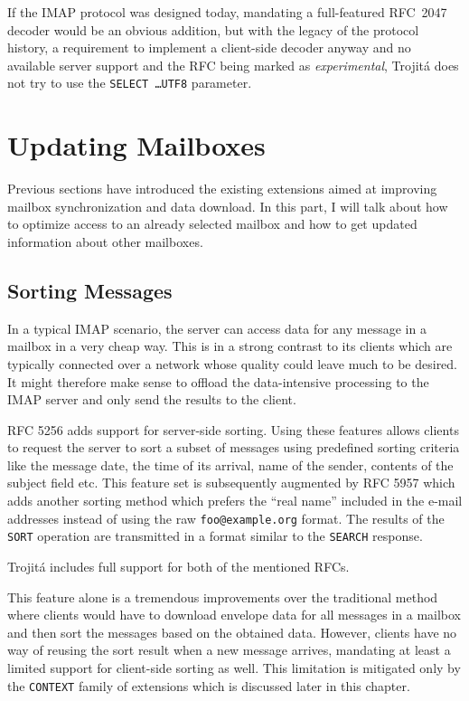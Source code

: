 \documentclass[trojita]{subfiles}
\begin{document}
\begin{trojitabehavior}
If the IMAP protocol was designed today, mandating a full-featured RFC~2047 decoder would be an obvious addition, but
with the legacy of the protocol history, a requirement to implement a client-side decoder anyway and no available server
support and the RFC being marked as {\em experimental}, Trojitá does not try to use the {\tt SELECT \ldots UTF8}
parameter.
\end{trojitabehavior}

\section{Updating Mailboxes}

Previous sections have introduced the existing extensions aimed at improving mailbox synchronization and data download.
In this part, I will talk about how to optimize access to an already selected mailbox and how to get updated information
about other mailboxes.

\subsection{Sorting Messages}

In a typical IMAP scenario, the server can access data for any message in a mailbox in a very cheap way.  This is in a
strong contrast to its clients which are typically connected over a network whose quality could leave much to be
desired.  It might therefore make sense to offload the data-intensive processing to the IMAP server and only send the
results to the client.

RFC 5256 \cite{rfc5256} adds support for server-side sorting.  Using these features allows clients to request the server
to sort a subset of messages using predefined sorting criteria like the message date, the time of its arrival, name of
the sender, contents of the subject field etc.  This feature set is subsequently augmented by RFC 5957 \cite{rfc5957}
which adds another sorting method which prefers the ``real name'' included in the e-mail addresses instead of using the
raw {\tt foo@example.org} format.  The results of the {\tt SORT} operation are transmitted in a format similar to the
{\tt SEARCH} response.

\begin{trojitabehavior}
Trojitá includes full support for both of the mentioned RFCs.
\end{trojitabehavior}

This feature alone is a tremendous improvements over the traditional method where clients would have to download
envelope data for all messages in a mailbox and then sort the messages based on the obtained data.  However, clients
have no way of reusing the sort result when a new message arrives, mandating at least a limited support for client-side
sorting as well.  This limitation is mitigated only by the {\tt CONTEXT} family of extensions which is discussed later
in this chapter.
\end{document}
